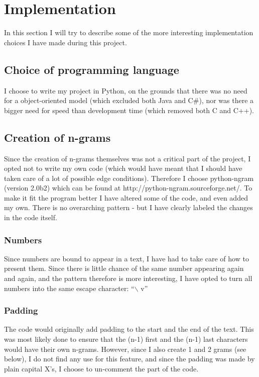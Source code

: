 \section{Implementation}
\label{implementation}

In this section I will try to describe some of the more interesting implementation choices I have made during this project.

\subsection{Choice of programming language}
I choose to write my project in Python, on the grounds that there was no need for a object-oriented model (which excluded both Java and C\#), nor was there a bigger need for speed than development time (which removed both C and C++).

\subsection{Creation of n-grams}
Since the creation of n-grams themselves was not a critical part of the project, I opted not to write my own code (which would have meant that I should have taken care of a lot of possible edge conditions). Therefore I choose python-ngram (version 2.0b2) which can be found at http://python-ngram.sourceforge.net/. To make it fit the program better I have altered some of the code, and even added my own. There is no overarching pattern - but I have clearly labeled the changes in the code itself.
\subsubsection{Numbers}
Since numbers are bound to appear in a text, I have had to take care of how to present them. Since there is little chance of the same number appearing again and again, and the pattern therefore is more interesting, I have opted to turn all numbers into the same escape character: ``$\backslash$ v''
\subsubsection{Padding}
The code would originally add padding to the start and the end of the text. This was most likely done to ensure that the (n-1) first and the (n-1) last characters would have their own n-grams. However, since I also create 1 and 2 grams (see below), I do not find any use for this feature, and since the padding was made by plain capital X's, I choose to un-comment the part of the code.

